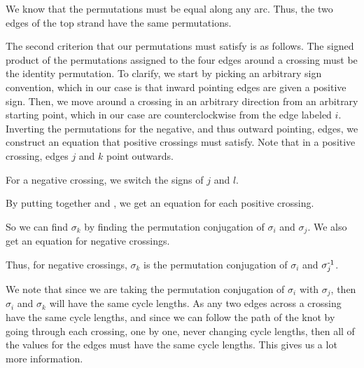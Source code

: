 \begin{paper}
We know that the permutations must be equal along any arc.
Thus, the two edges of the top strand have the same permutations.


The second criterion that our permutations must satisfy is as follows.
The signed product of the permutations assigned to the four edges around a
crossing must be the identity permutation.
To clarify, we start by picking an arbitrary sign convention, which in our case
is that inward pointing edges are given a positive sign.
Then, we move around a crossing in an arbitrary direction from an arbitrary
starting point, which in our case are counterclockwise from the edge labeled
$i$.
Inverting the permutations for the negative, and thus outward pointing, edges,
we construct an equation that positive crossings must satisfy.
Note that in a positive crossing, edges $j$ and $k$ point outwards.

\begin{paperwhere}
\end{paperwhere}

For a negative crossing, we switch the signs of $j$ and $l$.


By putting together \eqUpper and \eqPositive, we get an equation for each
positive crossing.


So we can find $\sigma_k$ by finding the permutation conjugation of $\sigma_i$
and $\sigma_j$.
We also get an equation for negative crossings.


Thus, for negative crossings, $\sigma_k$ is the permutation conjugation of
$\sigma_i$ and $\sigma_j^{\text-1}$.


We note that since we are taking the permutation conjugation of $\sigma_i$ with
$\sigma_j$, then $\sigma_i$ and $\sigma_k$ will have the same cycle lengths.
As any two edges across a crossing have the same cycle lengths, and since we can
follow the path of the knot by going through each crossing, one by one, never
changing cycle lengths, then all of the values for the edges must have the same
cycle lengths.
This gives us a lot more information.


\end{paper}
